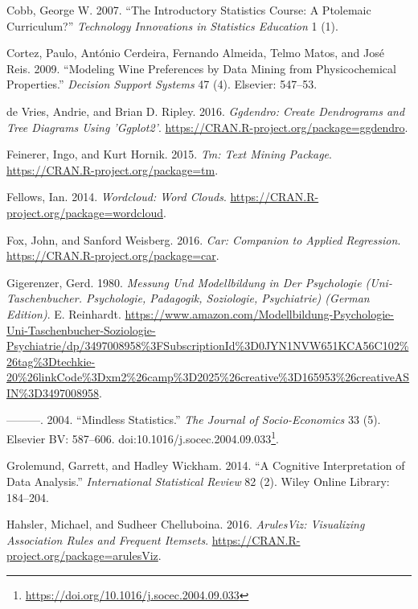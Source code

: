 \documentclass[12pt,]{book}
\renewcommand{\href}[2]{#2\footnote{\url{#1}}}
\begin{document}
\hypertarget{ref-cobb2007introductory}{}
Cobb, George W. 2007. ``The Introductory Statistics Course: A Ptolemaic
Curriculum?'' \emph{Technology Innovations in Statistics Education} 1
(1).

\hypertarget{ref-cortez2009modeling}{}
Cortez, Paulo, António Cerdeira, Fernando Almeida, Telmo Matos, and José
Reis. 2009. ``Modeling Wine Preferences by Data Mining from
Physicochemical Properties.'' \emph{Decision Support Systems} 47 (4).
Elsevier: 547--53.

\hypertarget{ref-R-ggdendro}{}
de Vries, Andrie, and Brian D. Ripley. 2016. \emph{Ggdendro: Create
Dendrograms and Tree Diagrams Using 'Ggplot2'}.
\url{https://CRAN.R-project.org/package=ggdendro}.

\hypertarget{ref-R-tm}{}
Feinerer, Ingo, and Kurt Hornik. 2015. \emph{Tm: Text Mining Package}.
\url{https://CRAN.R-project.org/package=tm}.

\hypertarget{ref-R-wordcloud}{}
Fellows, Ian. 2014. \emph{Wordcloud: Word Clouds}.
\url{https://CRAN.R-project.org/package=wordcloud}.

\hypertarget{ref-R-car}{}
Fox, John, and Sanford Weisberg. 2016. \emph{Car: Companion to Applied
Regression}. \url{https://CRAN.R-project.org/package=car}.

\hypertarget{ref-9783497008957}{}
Gigerenzer, Gerd. 1980. \emph{Messung Und Modellbildung in Der
Psychologie (Uni-Taschenbucher. Psychologie, Padagogik, Soziologie,
Psychiatrie) (German Edition)}. E. Reinhardt.
\url{https://www.amazon.com/Modellbildung-Psychologie-Uni-Taschenbucher-Soziologie-Psychiatrie/dp/3497008958\%3FSubscriptionId\%3D0JYN1NVW651KCA56C102\%26tag\%3Dtechkie-20\%26linkCode\%3Dxm2\%26camp\%3D2025\%26creative\%3D165953\%26creativeASIN\%3D3497008958}.

\hypertarget{ref-Gigerenzer2004}{}
---------. 2004. ``Mindless Statistics.'' \emph{The Journal of
Socio-Economics} 33 (5). Elsevier BV: 587--606.
doi:\href{https://doi.org/10.1016/j.socec.2004.09.033}{10.1016/j.socec.2004.09.033}.

\hypertarget{ref-grolemund2014cognitive}{}
Grolemund, Garrett, and Hadley Wickham. 2014. ``A Cognitive
Interpretation of Data Analysis.'' \emph{International Statistical
Review} 82 (2). Wiley Online Library: 184--204.

\hypertarget{ref-R-arulesViz}{}
Hahsler, Michael, and Sudheer Chelluboina. 2016. \emph{ArulesViz:
Visualizing Association Rules and Frequent Itemsets}.
\url{https://CRAN.R-project.org/package=arulesViz}.
\end{document}
